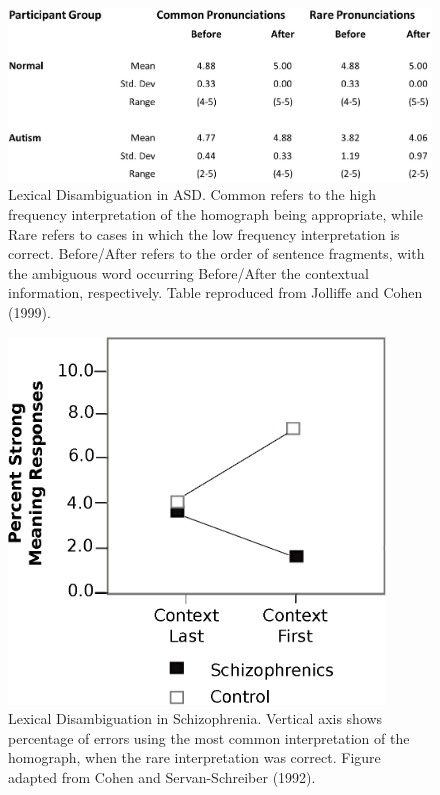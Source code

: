 \begin{figure}[tp]
\begin{center}
	\includegraphics[width=115mm]{figures/asd_lexamb_study_results.eps}
\end{center}
\caption{Lexical Disambiguation in ASD. Common refers to the high frequency interpretation of the homograph being appropriate, while Rare refers to cases in which the low frequency interpretation is correct. Before/After refers to the order of sentence fragments, with the ambiguous word occurring Before/After the contextual information, respectively. Table reproduced from Jolliffe and Cohen (1999).}
\label{asd-lexamb-study}
\end{figure} 

\begin{figure}[tp]
\begin{center}
	\includegraphics[width=100mm]{figures/schiz_lexamb_study_results.eps}
\end{center}
\caption{Lexical Disambiguation in Schizophrenia. Vertical axis shows percentage of errors using the most common interpretation of the homograph, when the rare interpretation was correct. Figure adapted from Cohen and Servan-Schreiber (1992).}
\label{schiz-lexamb-study}
\end{figure} 

